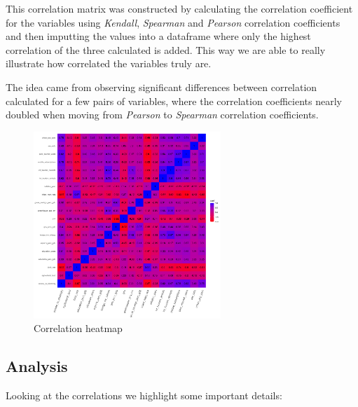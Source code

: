 \documentclass[]{article}
\begin{document}
This correlation matrix was constructed by calculating the correlation
coefficient for the variables using \emph{Kendall}, \emph{Spearman} and
\emph{Pearson} correlation coefficients and then imputting the values
into a dataframe where only the highest correlation of the three
calculated is added. This way we are able to really illustrate how
correlated the variables truly are.

The idea came from observing significant differences between correlation
calculated for a few pairs of variables, where the correlation
coefficients nearly doubled when moving from \emph{Pearson} to
\emph{Spearman} correlation coefficients.

\newpage

\begin{figure}
\centering
\includegraphics[width=0.63\textwidth,height=\textheight]{./img/correl_heatmap.png}
\caption{Correlation heatmap}
\end{figure}

\hypertarget{analysis}{%
\subsection{Analysis}\label{analysis}}

Looking at the correlations we highlight some important details:
\end{document}
